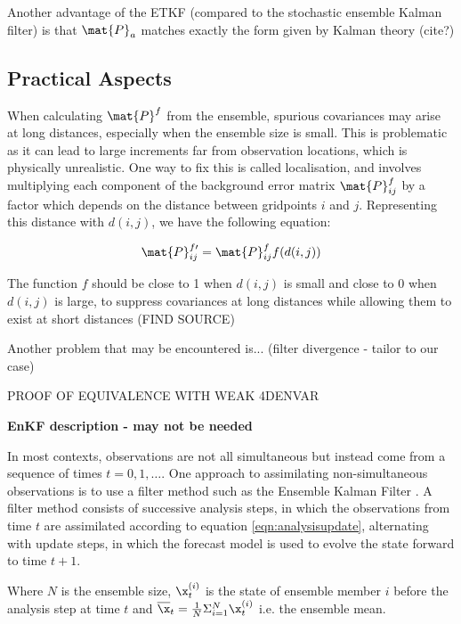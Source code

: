 Another advantage of the ETKF (compared to the stochastic ensemble Kalman filter) is that $\mat{P}_a$ matches exactly the form given by Kalman theory (cite?)

\subsection{Practical Aspects}
\label{sec:DApractice}

When calculating $\mat{P}^f$ from the ensemble, spurious covariances may arise at long distances, especially when the ensemble size is small. This is problematic as it can lead to large increments far from observation locations, which is physically unrealistic. One way to fix this is called localisation, and involves multiplying each component of the background error matrix $\mat{P}^f_{ij}$ by a factor which depends on the distance between gridpoints $i$ and $j$. Representing this distance with $d(i,j)$, we have the following equation:

\begin{equation}
\mat{P}^{f\prime}_{ij} = \mat{P}^f_{ij} f(d(i,j))
\end{equation}

The function $f$ should be close to 1 when $d(i,j)$ is small and close to 0 when $d(i,j)$ is large, to suppress covariances at long distances while allowing them to exist at short distances (FIND SOURCE)

Another problem that may be encountered is... (filter divergence - tailor to our case)

PROOF OF EQUIVALENCE WITH WEAK 4DENVAR

\textbf{EnKF description - may not be needed}

In most contexts, observations are not all simultaneous but instead come from a sequence of times $t = 0,1,\dots$. One approach to assimilating non-simultaneous observations is to use a filter method such as the Ensemble Kalman Filter \parencite{Evensen1994,Houtekamer1998,Anderson2001}. A filter method consists of successive analysis steps, in which the observations from time $t$ are assimilated according to equation \ref{eqn:analysisupdate}, alternating with update steps, in which the forecast model is used to evolve the state forward to time $t+1$.

Where $N$ is the ensemble size, $\x_t^{(i)}$ is the state of ensemble member $i$ before the analysis step at time $t$ and $\overline{\x}_t = \frac{1}{N} \Sigma_{i=1}^{N} \x_t^{(i)}$ i.e. the ensemble mean.

